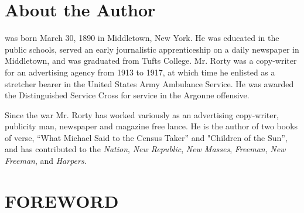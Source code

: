 \documentclass[nohyper,openany,nobib]{tufte-book}
\let\oldchapter\chapter
\def\chapter{%
  \setcounter{footnote}{0}%
  \oldchapter
}
\newcounter{oldtocdepth}
\newcommand{\hidefromtoc}{%
  \setcounter{oldtocdepth}{\value{tocdepth}}%
  \addtocontents{toc}{\protect\setcounter{tocdepth}{-10}}%
}
\newcommand{\unhidefromtoc}{%
  \addtocontents{toc}{\protect\setcounter{tocdepth}{\value{oldtocdepth}}}%
}
\begin{document}
\begin{fullwidth}
\newpage
\thispagestyle{empty}

\begin{adjustwidth}{0pt}{0pt}

\par{}

\end{adjustwidth}

\end{fullwidth}

\thispagestyle{empty}
\begingroup
\setlength{\parindent}{0cm}\setlength{\parskip}{2ex plus 0.3ex minus 0.1ex}
\hidefromtoc
\chapter{About the Author}
\unhidefromtoc


 was born March 30, 1890 in Middletown, New York. He was
educated in the public schools, served an early journalistic
apprenticeship on a daily newspaper in Middletown, and was graduated
from Tufts College. Mr. Rorty was a copy-writer for an advertising
agency from 1913 to 1917, at which time he enlisted as a stretcher
bearer in the United States Army Ambulance Service. He was awarded the
Distinguished Service Cross for service in the Argonne offensive.

Since the war Mr. Rorty has worked variously as an advertising
copy-writer, publicity man, newspaper and magazine free lance. He is the
author of two books of verse, ``What Michael Said to the Census Taker''
and "Children of the Sun'', and has contributed to the \emph{Nation},
\emph{New Republic}, \emph{New Masses}, \emph{Freeman}, \emph{New
Freeman}, and \emph{Harpers.}

\endgroup


\begin{fullwidth}

\tableofcontents

\end{fullwidth}


\chapter{FOREWORD}
\label{ch:foreword}
\end{document}
